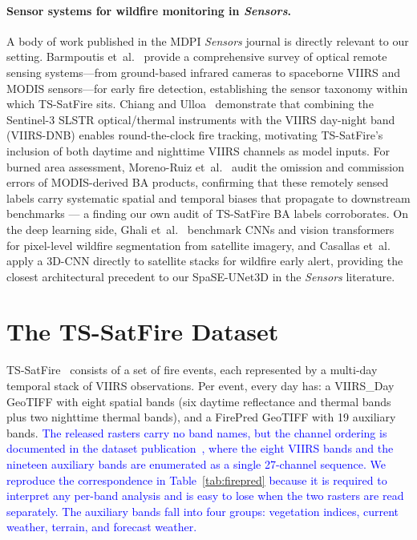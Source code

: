 \documentclass[sensors,article,submit,moreauthors,pdftex]{Definitions/mdpi}
\newcommand{\rev}[1]{\textcolor{blue}{#1}}
\begin{document}
\paragraph*{Sensor systems for wildfire monitoring in \emph{Sensors}.}
A body of work published in the MDPI \emph{Sensors} journal is
directly relevant to our setting.
Barmpoutis et~al.~\cite{barmpoutis2020review} provide a comprehensive
survey of optical remote sensing systems---from ground-based
infrared cameras to spaceborne VIIRS and MODIS sensors---for early
fire detection, establishing the sensor taxonomy within which TS-SatFire
sits.
Chiang and Ulloa~\cite{chiang2019mapping} demonstrate that combining
the Sentinel-3 SLSTR optical/thermal instruments with the VIIRS day-night
band (VIIRS-DNB) enables round-the-clock fire tracking, motivating
TS-SatFire's inclusion of both daytime and nighttime VIIRS
channels as model inputs.
For burned area assessment, Moreno-Ruiz et~al.~\cite{morenoruiz2020modis}
audit the omission and commission errors of MODIS-derived BA
products, confirming that these remotely sensed labels carry systematic
spatial and temporal biases that propagate to downstream benchmarks
--- a finding our own audit of TS-SatFire BA labels corroborates.
On the deep learning side, Ghali et~al.~\cite{ghali2022deep} benchmark
CNNs and vision transformers for pixel-level wildfire segmentation from
satellite imagery, and Casallas et~al.~\cite{casallas2022forest} apply a
3D-CNN directly to satellite stacks for wildfire early alert,
providing the closest architectural precedent to our SpaSE-UNet3D in
the \emph{Sensors} literature.

\section{The TS-SatFire Dataset}
\label{sec:dataset}

TS-SatFire~\cite{zhao2025tssatfire} consists of a set of fire events, each represented by a multi-day temporal stack of VIIRS observations. Per event, every day has: a VIIRS\_Day GeoTIFF with eight spatial bands (six daytime reflectance and thermal bands plus two nighttime thermal bands), and a FirePred GeoTIFF with 19 auxiliary bands. \rev{The released rasters carry
no band names, but the channel ordering is documented in the dataset
publication~\cite{zhao2025tssatfire}, where the eight VIIRS bands and the
nineteen auxiliary bands are enumerated as a single 27-channel sequence. We
reproduce the correspondence in Table~\ref{tab:firepred} because it is required
to interpret any per-band analysis and is easy to lose when the two rasters are
read separately. The auxiliary bands fall into four groups: vegetation indices,
current weather, terrain, and forecast weather.}
\end{document}
